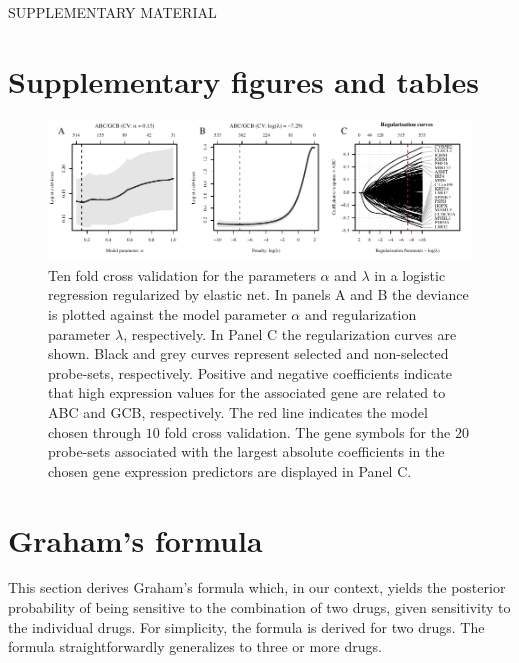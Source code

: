 % 
% 

{}
\begin{center}
{\huge SUPPLEMENTARY MATERIAL}\bigskip \\
{\bf \hemaClassTitle{}}
\end{center}

\section{Supplementary figures and tables}

\begin{figure}[htb]
\begin{center}
\includegraphics[width=1\textwidth]{figures/CrosvalidationClass.pdf}
\end{center}
\caption{Ten fold cross validation for the parameters $\alpha$ and $\lambda$ in a logistic regression regularized by elastic net.
In panels A and B the deviance is plotted against the model parameter $\alpha$ and regularization parameter $\lambda$, respectively.
In Panel C the regularization curves are shown.
Black and grey curves represent selected and non-selected probe-sets, respectively.
Positive and negative coefficients indicate that high expression values for the associated gene are related to ABC and GCB, respectively.
The red line indicates the model chosen through $10$ fold cross validation.
The gene symbols for the $20$ probe-sets associated with the largest absolute coefficients in the chosen gene expression predictors are displayed in Panel C.}
\label{fig:crossval}
\end{figure}





\clearpage



\section{Graham's formula}
\label{sec:graham}
This section derives Graham's formula which, in our context, yields the posterior probability of being sensitive to the combination of two drugs, given sensitivity to the individual drugs.
For simplicity, the formula is derived for two drugs.
The formula straightforwardly generalizes to three or more drugs.

